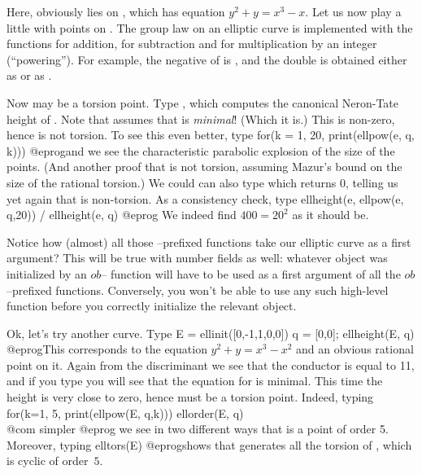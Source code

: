 Here,  obviously lies on , which has equation
$y^2+y = x^3-x$.  Let us now play a little with points on .
The group law on an elliptic curve is implemented with the functions
 for addition,  for subtraction and
 for multiplication by an integer (``powering'').  For
example, the negative of  is , and the
double is obtained either as  or as
.

Now  may be a torsion point. Type , which
computes the canonical Neron-Tate height of . Note that
 assumes that  is \emph{minimal}! (Which it is.)
This is non-zero, hence  is not torsion. To see this even better,
type
\bprog
  for(k = 1, 20, print(ellpow(e, q, k)))
@eprog\noindent and we see the characteristic parabolic explosion of the size
of the points. (And another proof that  is not torsion, assuming
Mazur's bound on the size of the rational torsion.) We could can also type
 which returns 0, telling us yet again that  is
non-torsion. As a consistency check, type
\bprog
  ellheight(e, ellpow(e, q,20)) / ellheight(e, q)
@eprog\noindent
We indeed find $400=20^2$ as it should be.

Notice how (almost) all those --prefixed functions take our
elliptic curve as a first argument? This will be true with number
fields as well: whatever object was initialized by an $ob$--
function will have to be used as a first argument of all the
$ob$--prefixed functions. Conversely, you won't be able to use any
such high-level function before you correctly initialize the relevant
object. \smallskip

Ok, let's try another curve. Type
\bprog
  E = ellinit([0,-1,1,0,0])
  q = [0,0]; ellheight(E, q)
@eprog\noindent This corresponds to the equation $y^2+y = x^3-x^2$ and an
obvious rational point on it. Again from the discriminant we see that the
conductor is equal to 11, and if you type  you will
see that the equation  for  is minimal. This time the height is very
close to zero, hence  must be a torsion point. Indeed, typing
\bprog
  for(k=1, 5, print(ellpow(E, q,k)))
  ellorder(E, q)   \\@com simpler
@eprog\noindent
we see in two different ways that  is a point of order 5. Moreover,
typing
\bprog
  elltors(E)
@eprog\noindent shows that  generates all the torsion of ,
which is cyclic of order~$5$. \smallskip

